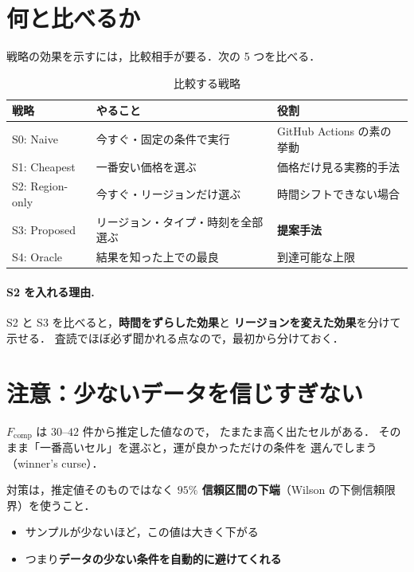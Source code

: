 \documentclass[11pt,a4paper]{ltjsarticle}
\newcommand{\Fcomp}{F_{\mathrm{comp}}}
\begin{document}
\section{何と比べるか}

戦略の効果を示すには，比較相手が要る．次の 5 つを比べる．

\begin{table}[htbp]
\centering
\caption{比較する戦略}
\begin{tabularx}{\textwidth}{@{}llX@{}}
\toprule
戦略 & やること & 役割 \\
\midrule
S0: Naive       & 今すぐ・固定の条件で実行 & GitHub Actions の素の挙動 \\
\addlinespace
S1: Cheapest    & 一番安い価格を選ぶ & 価格だけ見る実務的手法 \\
\addlinespace
S2: Region-only & 今すぐ・リージョンだけ選ぶ & 時間シフトできない場合 \\
\addlinespace
S3: Proposed    & リージョン・タイプ・時刻を全部選ぶ & \textbf{提案手法} \\
\addlinespace
S4: Oracle      & 結果を知った上での最良 & 到達可能な上限 \\
\bottomrule
\end{tabularx}
\end{table}

\paragraph{S2 を入れる理由.}
S2 と S3 を比べると，\textbf{時間をずらした効果}と
\textbf{リージョンを変えた効果}を分けて示せる．
査読でほぼ必ず聞かれる点なので，最初から分けておく．

\section{注意：少ないデータを信じすぎない}

$\Fcomp$ は $30$--$42$ 件から推定した値なので，
たまたま高く出たセルがある．
そのまま「一番高いセル」を選ぶと，運が良かっただけの条件を
選んでしまう（winner's curse）．

対策は，推定値そのものではなく
\textbf{$95\%$ 信頼区間の下端}（Wilson の下側信頼限界）を使うこと．

\begin{itemize}
  \item サンプルが少ないほど，この値は大きく下がる
  \item つまり\textbf{データの少ない条件を自動的に避けてくれる}
\end{itemize}
\end{document}
